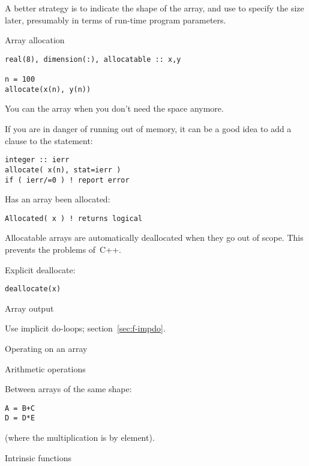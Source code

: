 A better strategy is to indicate the shape of the array, and use
 to specify
the size later, presumably in terms of run-time program parameters.

\begin{block}{Array allocation}
  \label{sl:farray-alloc}
\begin{verbatim}
real(8), dimension(:), allocatable :: x,y

n = 100
allocate(x(n), y(n))
\end{verbatim}
You can  the array when you don't need the
space anymore.
\end{block}

If you are in danger of running out of memory, it can be a good idea
to add a  clause to the  statement:
\begin{verbatim}
integer :: ierr
allocate( x(n), stat=ierr )
if ( ierr/=0 ) ! report error
\end{verbatim}

Has an array been allocated:
\begin{verbatim}
Allocated( x ) ! returns logical
\end{verbatim}

Allocatable arrays are automatically deallocated when they go out of
scope. This prevents the  problems of~C++.

Explicit deallocate:
\begin{verbatim}
deallocate(x)
\end{verbatim}

 {Array output}

Use implicit do-loops; section~\ref{sec:f-impdo}.

 {Operating on an array}

 {Arithmetic operations}

Between arrays of the same shape:
\begin{verbatim}
A = B+C
D = D*E
\end{verbatim}
(where the multiplication is by element).

 {Intrinsic functions}

